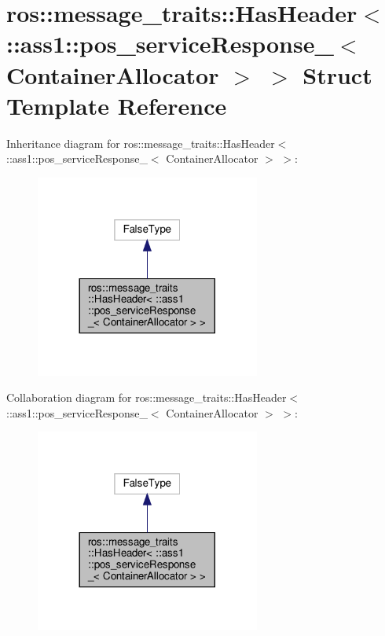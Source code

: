 \hypertarget{structros_1_1message__traits_1_1HasHeader_3_01_1_1ass1_1_1pos__serviceResponse___3_01ContainerAllocator_01_4_01_4}{}\section{ros\+:\+:message\+\_\+traits\+:\+:Has\+Header$<$ \+:\+:ass1\+:\+:pos\+\_\+service\+Response\+\_\+$<$ Container\+Allocator $>$ $>$ Struct Template Reference}
\label{structros_1_1message__traits_1_1HasHeader_3_01_1_1ass1_1_1pos__serviceResponse___3_01ContainerAllocator_01_4_01_4}


Inheritance diagram for ros\+:\+:message\+\_\+traits\+:\+:Has\+Header$<$ \+:\+:ass1\+:\+:pos\+\_\+service\+Response\+\_\+$<$ Container\+Allocator $>$ $>$\+:
\nopagebreak
\begin{figure}[H]
\begin{center}
\leavevmode
\includegraphics[width=209pt]{structros_1_1message__traits_1_1HasHeader_3_01_1_1ass1_1_1pos__serviceResponse___3_01ContainerAl8344a6fe5d770b045af711ccf0fd0c79}
\end{center}
\end{figure}


Collaboration diagram for ros\+:\+:message\+\_\+traits\+:\+:Has\+Header$<$ \+:\+:ass1\+:\+:pos\+\_\+service\+Response\+\_\+$<$ Container\+Allocator $>$ $>$\+:
\nopagebreak
\begin{figure}[H]
\begin{center}
\leavevmode
\includegraphics[width=209pt]{structros_1_1message__traits_1_1HasHeader_3_01_1_1ass1_1_1pos__serviceResponse___3_01ContainerAllocator_01_4_01_4__coll__graph}
\end{center}
\end{figure}



